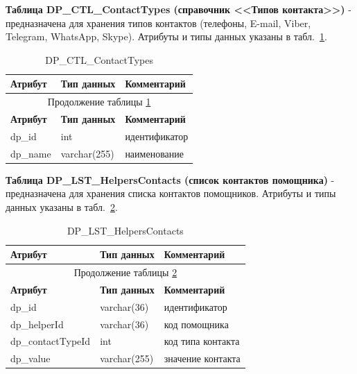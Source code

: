 \textbf{Таблица DP\_CTL\_ContactTypes (справочник <<Типов контакта>>)} - предназначена для хранения типов контактов (телефоны, E-mail, Viber, Telegram, WhatsApp, Skype).
Атрибуты и типы данных указаны в табл.~\ref{tab:DP_CTL_ContactTypes}.

\begin{longtable}{|p{5.5cm}|p{3.5cm}|p{7.5cm}|}
    \caption{DP\_CTL\_ContactTypes} \label{tab:DP_CTL_ContactTypes} \\
    \hline
    \textbf{Атрибут} & \textbf{Тип данных} & \textbf{Комментарий} \\ \hline
    \endfirsthead

    \multicolumn{3}{c}{Продолжение таблицы \ref{tab:DP_CTL_ContactTypes}} \\
    \hline
    \textbf{Атрибут} & \textbf{Тип данных} & \textbf{Комментарий} \\ \hline
    \endhead

    \endfoot

    \endlastfoot
    dp\_id & int & идентификатор \\ \hline
    dp\_name & varchar(255) & наименование \\ \hline
\end{longtable}

\textbf{Таблица DP\_LST\_HelpersContacts (список контактов помощника)} - предназначена для хранения списка контактов помощников.
Атрибуты и типы данных указаны в табл.~\ref{tab:DP_LST_HelperContacts}.

\begin{longtable}{|p{5.5cm}|p{3.5cm}|p{7.5cm}|}
    \caption{DP\_LST\_HelpersContacts} \label{tab:DP_LST_HelperContacts} \\
    \hline
    \textbf{Атрибут} & \textbf{Тип данных} & \textbf{Комментарий} \\ \hline
    \endfirsthead

    \multicolumn{3}{c}{Продолжение таблицы \ref{tab:DP_LST_HelperContacts}} \\
    \hline
    \textbf{Атрибут} & \textbf{Тип данных} & \textbf{Комментарий} \\ \hline
    \endhead

    \endfoot

    \endlastfoot
    dp\_id & varchar(36) & идентификатор \\ \hline
    dp\_helperId & varchar(36) & код помощника \\ \hline
    dp\_contactTypeId & int & код типа контакта \\ \hline
    dp\_value & varchar(255) & значение контакта \\ \hline
\end{longtable}

